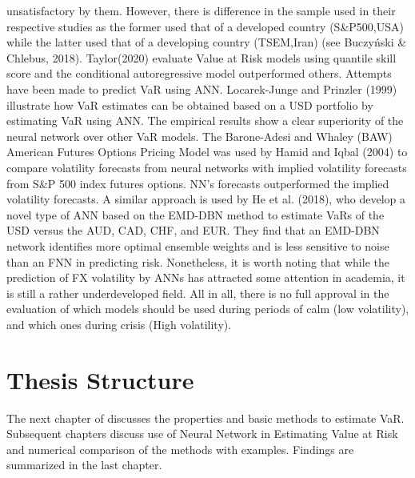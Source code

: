 \documentclass[a4paper,11pt,oneside]{book}
\begin{document}
unsatisfactory by them. However, there is difference in the sample used in their respective studies as the former used that of a developed country (S\&P500,USA) while the latter used that of a developing  country (TSEM,Iran) (see Buczyński \& Chlebus, 2018). Taylor(2020) evaluate Value at Risk models using quantile skill score and the conditional autoregressive model outperformed others.
\newline\newline
Attempts have been made to predict VaR using ANN. Locarek-Junge and Prinzler (1999) illustrate how VaR estimates can be obtained based on a USD portfolio by estimating VaR using ANN. The empirical results show a clear superiority of the neural network over other VaR models. The Barone-Adesi and Whaley (BAW) American Futures Options Pricing Model was used by Hamid and Iqbal (2004) to compare volatility forecasts from neural networks with implied volatility forecasts from S\&P 500 index futures options. NN's forecasts outperformed the implied volatility forecasts. A similar approach is used by He et al. (2018), who develop a novel type of ANN based on the EMD-DBN method to estimate VaRs of the USD versus the AUD, CAD, CHF, and EUR. They find that an EMD-DBN network identifies more optimal ensemble weights and is less sensitive to noise than an FNN in predicting risk. Nonetheless, it is worth noting that while the prediction of FX volatility by ANNs has attracted some attention in academia, it is still a rather underdeveloped field.
\newline\newline
All in all, there is no full approval in the evaluation of which models should be used during
periods of calm (low volatility), and which ones during crisis (High volatility).


\section{Thesis Structure}
The next chapter of discusses the properties and basic methods to estimate VaR. Subsequent chapters discuss use of Neural Network in Estimating Value at Risk and numerical comparison of the methods with examples. Findings are summarized in the last chapter.



\end{document}
